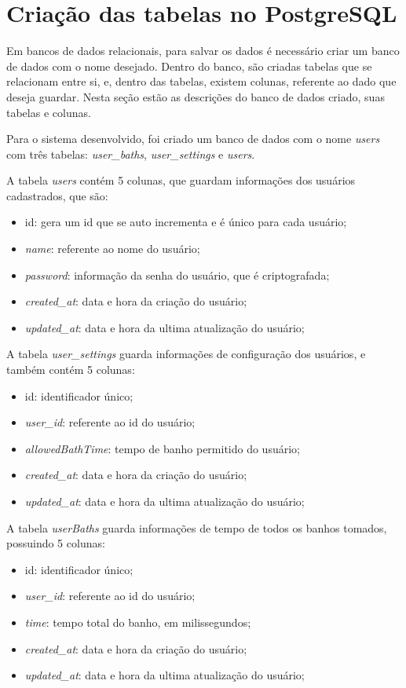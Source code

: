 \section{Criação das tabelas no PostgreSQL}

Em bancos de dados relacionais, para salvar os dados é necessário criar um banco de dados com o nome desejado. Dentro do banco, são criadas tabelas que se relacionam entre si, e, dentro das tabelas, existem colunas, referente ao dado que deseja guardar. Nesta seção estão as descrições do banco de dados criado, suas tabelas e colunas.

Para o sistema desenvolvido, foi criado um banco de dados com o nome \textit{users} com três tabelas: \textit{user\_baths}, \textit{user\_settings} e \textit{users}.

A tabela \textit{users} contém 5 colunas, que guardam informações dos usuários cadastrados, que são:
\begin{itemize}
	\item id: gera um id que se auto incrementa e é único para cada usuário;
	\item \textit{name}: referente ao nome do usuário;
	\item \textit{password}: informação da senha do usuário, que é criptografada;
	\item \textit{created\_at}: data e hora da criação do usuário;
	\item \textit{updated\_at}: data e hora da ultima atualização do usuário;
\end{itemize}

A tabela \textit{user\_settings} guarda informações de configuração dos usuários, e também contém 5 colunas:

\begin{itemize}
	\item id: identificador único;
	\item \textit{user\_id}: referente ao id do usuário;
	\item \textit{allowedBathTime}: tempo de banho permitido do usuário;
	\item \textit{created\_at}: data e hora da criação do usuário;
	\item \textit{updated\_at}: data e hora da ultima atualização do usuário;
\end{itemize}

A tabela \textit{userBaths} guarda informações de tempo de todos os banhos tomados, possuindo 5 colunas:

\begin{itemize}
	\item id: identificador único;
	\item \textit{user\_id}: referente ao id do usuário;
	\item \textit{time}: tempo total do banho, em milissegundos;
	\item \textit{created\_at}: data e hora da criação do usuário;
	\item \textit{updated\_at}: data e hora da ultima atualização do usuário;
\end{itemize}

